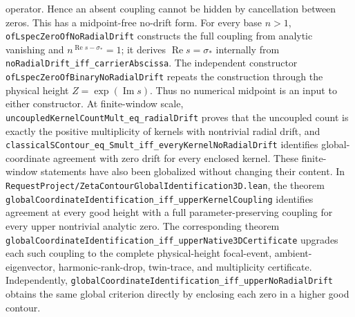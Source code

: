 \documentclass[11pt]{article}
\theoremstyle{definition}
\begin{document}
operator.  Hence an absent coupling cannot be hidden by cancellation between
zeros.  This has a midpoint-free no-drift form.  For every base \(n>1\),
\texttt{ofLspecZeroOfNoRadialDrift} constructs the full coupling from analytic
vanishing and \(n^{\operatorname{Re}s-\sigma_*}=1\); it derives
\(\operatorname{Re}s=\sigma_*\) internally from
\texttt{noRadialDrift\_iff\_carrierAbscissa}.  The independent constructor
\texttt{ofLspecZeroOfBinaryNoRadialDrift} repeats the construction through the
physical height \(Z=\exp(\operatorname{Im}s)\).  Thus no numerical midpoint is
an input to either constructor.  At finite-window scale,
\texttt{uncoupledKernelCountMult\_eq\_radialDrift} proves that the uncoupled
count is exactly the positive multiplicity of kernels with nontrivial radial
drift, and
\texttt{classicalSContour\_eq\_Smult\_iff\_everyKernelNoRadialDrift} identifies
global-coordinate agreement with zero drift for every enclosed kernel.
These finite-window statements have also been globalized without changing their
content.  In
\texttt{RequestProject/ZetaContourGlobalIdentification3D.lean}, the theorem
\texttt{globalCoordinateIdentification\_iff\_upperKernelCoupling} identifies
agreement at every good height with a full parameter-preserving coupling for
every upper nontrivial analytic zero.  The corresponding theorem
\texttt{globalCoordinateIdentification\_iff\_upperNative3DCertificate} upgrades
each such coupling to the complete physical-height focal-event, ambient-eigenvector,
harmonic-rank-drop, twin-trace, and multiplicity certificate.  Independently,
\texttt{globalCoordinateIdentification\_iff\_upperNoRadialDrift} obtains the same
global criterion directly by enclosing each zero in a higher good contour.
\end{document}

